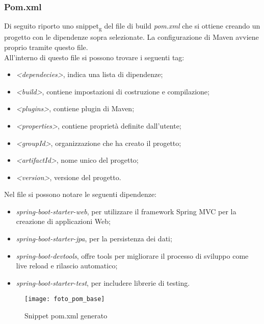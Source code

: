\subsubsection{Pom.xml}
Di seguito riporto uno snippet\textsubscript{g} del file di build \textit{pom.xml} che si ottiene creando un progetto con le dipendenze sopra selezionate. La configurazione di Maven avviene proprio tramite questo file.\\
All'interno di questo file si possono trovare i seguenti tag:
\begin{itemize}
\item \textit{<dependecies>}, indica una lista di dipendenze;
\item \textit{<build>}, contiene impostazioni di costruzione e compilazione;
\item \textit{<plugins>}, contiene plugin di Maven;
\item \textit{<properties>}, contiene proprietà definite dall'utente;
\item \textit{<groupId>}, organizzazione che ha creato il progetto;
\item \textit{<artifactId>}, nome unico del progetto;
\item \textit{<version>},  versione del progetto.
\end{itemize}

\noindent Nel file si possono notare le seguenti dipendenze:
\begin{itemize}
\item \textit{spring-boot-starter-web}, per utilizzare il framework Spring MVC per la creazione di applicazioni Web;
\item \textit{spring-boot-starter-jpa}, per la persistenza dei dati;
\item \textit{spring-boot-devtools}, offre tools per migliorare il processo di sviluppo come live reload e rilascio automatico;
\item \textit{spring-boot-starter-test}, per includere librerie di testing.
\end{itemize}

\begin{figure}[H] 
    \centering 
    \texttt{[image: foto\_pom\_base]} 
    \caption{Snippet pom.xml generato}
\end{figure}

